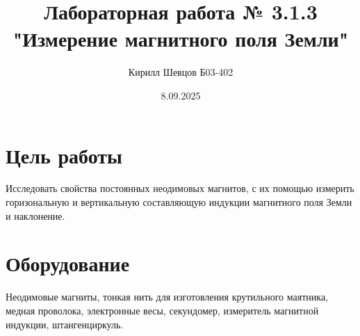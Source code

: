 \documentclass[a4paper, 10pt]{article}
\title{Лабораторная работа № 3.1.3 "Измерение магнитного поля Земли"}
\author{Кирилл Шевцов Б03-402}
\date{8.09.2025}
\begin{document}
\maketitle
\section*{Цель работы}
Исследовать свойства постоянных неодимовых магнитов, с их помощью измерить горизональную и вертикальную составляющую индукции магнитного поля Земли и наклонение.
\section*{Оборудование}
Неодимовые магниты, тонкая нить для изготовления крутильного маятника, медная проволока, электронные весы, секундомер, измеритель магнитной индукции, штангенциркуль.
\end{document}
